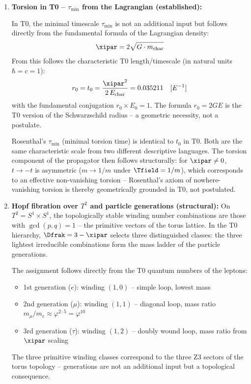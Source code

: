 \begin{enumerate}

  \item \textbf{Torsion in T0 -- $\tau_{\min}$ from the Lagrangian (established):}

  In T0, the minimal timescale $\tau_{\min}$ is not an additional input but follows directly from the fundamental formula of the Lagrangian density:
  \begin{equation}
    \xipar = 2\sqrt{G \cdot m_{\text{char}}}
  \end{equation}
  From this follows the characteristic T0 length/timescale (in natural units $\hbar = c = 1$):
  \begin{equation}
    r_0 = t_0 = \frac{\xipar^2}{2\,E_{\text{char}}} = 0.035211 \quad [E^{-1}]
  \end{equation}
  with the fundamental conjugation $r_0 \times E_0 = 1$. The formula $r_0 = 2GE$ is the T0 version of the Schwarzschild radius -- a geometric necessity, not a postulate.

  Rosenthal's $\tau_{\min}$ (minimal torsion time) is identical to $t_0$ in T0. Both are the same characteristic scale from two different descriptive languages. The torsion component of the propagator then follows structurally: for $\xipar \neq 0$, $t \to -t$ is asymmetric ($m \to 1/m$ under $\Tfield = 1/m$), which corresponds to an effective non-vanishing torsion -- Rosenthal's axiom of nowhere-vanishing torsion is thereby geometrically grounded in T0, not postulated.

  \item \textbf{Hopf fibration over $T^2$ and particle generations (structural):}
  On $T^2 = S^1 \times S^1$, the topologically stable winding number combinations are those with $\gcd(p,q) = 1$ -- the primitive vectors of the torus lattice. In the T0 hierarchy, $\Dfrak = 3 - \xipar$ selects three distinguished classes: the three lightest irreducible combinations form the mass ladder of the particle generations.

  The assignment follows directly from the T0 quantum numbers of the leptons:
  \begin{itemize}[noitemsep]
    \item 1st generation ($e$): winding $(1,0)$ -- simple loop, lowest mass
    \item 2nd generation ($\mu$): winding $(1,1)$ -- diagonal loop, mass ratio $m_\mu/m_e \approx \varphi^{2 \cdot 5} = \varphi^{10}$
    \item 3rd generation ($\tau$): winding $(1,2)$ -- doubly wound loop, mass ratio from $\xipar$ scaling
  \end{itemize}
  The three primitive winding classes correspond to the three Z3 sectors of the torus topology -- generations are not an additional input but a topological consequence.


\end{enumerate}
